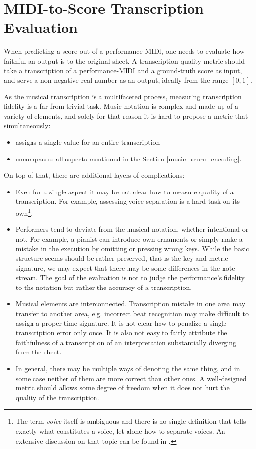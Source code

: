\chapter{MIDI-to-Score Transcription Evaluation}

When predicting a score out of a performance MIDI, one needs to evaluate how faithful an output is to the original sheet. A transcription quality metric should take a transcription of a performance-MIDI and a ground-truth score as input, and serve a non-negative real number as an output, ideally from the range $[0, 1]$.

As the musical transcription is a multifaceted process, measuring transcription fidelity is a far from trivial task. Music notation is complex and made up of a variety of elements, and solely for that reason it is hard to propose a metric that simultaneously: \begin{itemize}
	\item assigns a single value for an entire transcription
	\item encompasses all aspects mentioned in the Section \ref{music_score_encoding}. 
\end{itemize}

On top of that, there are additional layers of complications: \begin{itemize}
	\item Even for a single aspect it may be not clear how to measure quality of a transcription. For example, assessing voice separation is a hard task on its own\footnote{The term \emph{voice} itself is ambiguous and there is no single definition that tells exactly what constitutes a voice, let alone how to separate voices. An extensive discussion on that topic can be found in \cite{Cambouropoulos2008}.}.
	\item Performers tend to deviate from the musical notation, whether intentional or not. For example, a pianist can introduce own ornaments or simply make a mistake in the execution by omitting or pressing wrong keys. While the basic structure seems should be rather preserved, that is the key and metric signature, we may expect that there may be some differences in the note stream. The goal of the evaluation is not to judge the performance's fidelity to the notation but rather the accuracy of a transcription.
	\item Musical elements are interconnected. Transcription mistake in one area may transfer to another area, e.g. incorrect beat recognition may make difficult to assign a proper time signature. It is not clear how to penalize a single transcription error only once. It is also not easy to fairly attribute the faithfulness of a transcription of an interpretation substantially diverging from the sheet.
	\item In general, there may be multiple ways of denoting the same thing, and in some case neither of them are more correct than other ones. A well-designed metric should allows some degree of freedom when it does not hurt the quality of the transcription.
\end{itemize}

